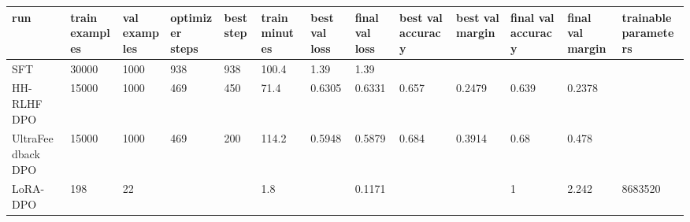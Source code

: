 \begin{tabular}{lllllllllllll}
\hline
run & train examples & val examples & optimizer steps & best step & train minutes & best val loss & final val loss & best val accuracy & best val margin & final val accuracy & final val margin & trainable parameters \\
\hline
SFT & 30000 & 1000 & 938 & 938 & 100.4 & 1.39 & 1.39 &  &  &  &  &  \\
HH-RLHF DPO & 15000 & 1000 & 469 & 450 & 71.4 & 0.6305 & 0.6331 & 0.657 & 0.2479 & 0.639 & 0.2378 &  \\
UltraFeedback DPO & 15000 & 1000 & 469 & 200 & 114.2 & 0.5948 & 0.5879 & 0.684 & 0.3914 & 0.68 & 0.478 &  \\
LoRA-DPO & 198 & 22 &  &  & 1.8 &  & 0.1171 &  &  & 1 & 2.242 & 8683520 \\
\hline
\end{tabular}
